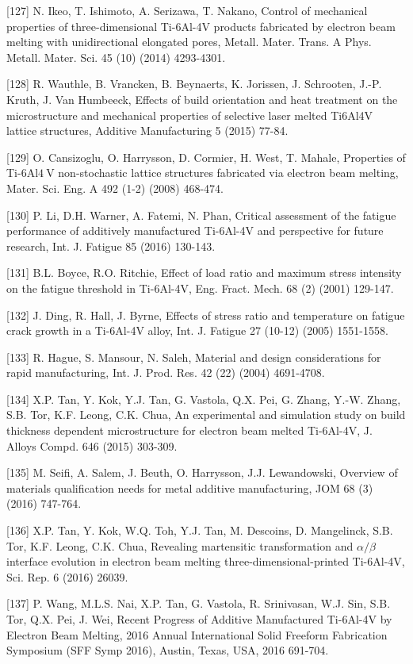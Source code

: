\documentclass[10pt]{article}
\begin{document}
[127] N. Ikeo, T. Ishimoto, A. Serizawa, T. Nakano, Control of mechanical properties of three-dimensional Ti-6Al-4V products fabricated by electron beam melting with unidirectional elongated pores, Metall. Mater. Trans. A Phys. Metall. Mater. Sci. 45 (10) (2014) 4293-4301.

[128] R. Wauthle, B. Vrancken, B. Beynaerts, K. Jorissen, J. Schrooten, J.-P. Kruth, J. Van Humbeeck, Effects of build orientation and heat treatment on the microstructure and mechanical properties of selective laser melted Ti6Al4V lattice structures, Additive Manufacturing 5 (2015) 77-84.

[129] O. Cansizoglu, O. Harrysson, D. Cormier, H. West, T. Mahale, Properties of Ti-6Al$4 \mathrm{~V}$ non-stochastic lattice structures fabricated via electron beam melting, Mater. Sci. Eng. A 492 (1-2) (2008) 468-474.

[130] P. Li, D.H. Warner, A. Fatemi, N. Phan, Critical assessment of the fatigue performance of additively manufactured Ti-6Al-4V and perspective for future research, Int. J. Fatigue 85 (2016) 130-143.

[131] B.L. Boyce, R.O. Ritchie, Effect of load ratio and maximum stress intensity on the fatigue threshold in Ti-6Al-4V, Eng. Fract. Mech. 68 (2) (2001) 129-147.

[132] J. Ding, R. Hall, J. Byrne, Effects of stress ratio and temperature on fatigue crack growth in a Ti-6Al-4V alloy, Int. J. Fatigue 27 (10-12) (2005) 1551-1558.

[133] R. Hague, S. Mansour, N. Saleh, Material and design considerations for rapid manufacturing, Int. J. Prod. Res. 42 (22) (2004) 4691-4708.

[134] X.P. Tan, Y. Kok, Y.J. Tan, G. Vastola, Q.X. Pei, G. Zhang, Y.-W. Zhang, S.B. Tor, K.F. Leong, C.K. Chua, An experimental and simulation study on build thickness dependent microstructure for electron beam melted Ti-6Al-4V, J. Alloys Compd. 646 (2015) 303-309.

[135] M. Seifi, A. Salem, J. Beuth, O. Harrysson, J.J. Lewandowski, Overview of materials qualification needs for metal additive manufacturing, JOM 68 (3) (2016) 747-764.

[136] X.P. Tan, Y. Kok, W.Q. Toh, Y.J. Tan, M. Descoins, D. Mangelinck, S.B. Tor, K.F. Leong, C.K. Chua, Revealing martensitic transformation and $\alpha / \beta$ interface evolution in electron beam melting three-dimensional-printed Ti-6Al-4V, Sci. Rep. 6 (2016) 26039.

[137] P. Wang, M.L.S. Nai, X.P. Tan, G. Vastola, R. Srinivasan, W.J. Sin, S.B. Tor, Q.X. Pei, J. Wei, Recent Progress of Additive Manufactured Ti-6Al-4V by Electron Beam Melting, 2016 Annual International Solid Freeform Fabrication Symposium (SFF Symp 2016), Austin, Texas, USA, 2016 691-704.
\end{document}
